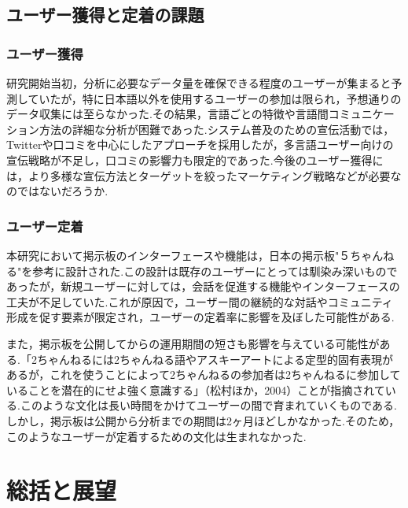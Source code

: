 \documentclass[b5paper,12pt,dvipdfmx]{jsreport}
\begin{document}
\subsection{ユーザー獲得と定着の課題}

\subsubsection{ユーザー獲得}
研究開始当初，分析に必要なデータ量を確保できる程度のユーザーが集まると予測していたが，特に日本語以外を使用するユーザーの参加は限られ，予想通りのデータ収集には至らなかった.その結果，言語ごとの特徴や言語間コミュニケーション方法の詳細な分析が困難であった.システム普及のための宣伝活動では，Twitterや口コミを中心にしたアプローチを採用したが，多言語ユーザー向けの宣伝戦略が不足し，口コミの影響力も限定的であった.今後のユーザー獲得には，より多様な宣伝方法とターゲットを絞ったマーケティング戦略などが必要なのではないだろうか.

\subsubsection{ユーザー定着}
本研究において掲示板のインターフェースや機能は，日本の掲示板"５ちゃんねる"を参考に設計された.この設計は既存のユーザーにとっては馴染み深いものであったが，新規ユーザーに対しては，会話を促進する機能やインターフェースの工夫が不足していた.これが原因で，ユーザー間の継続的な対話やコミュニティ形成を促す要素が限定され，ユーザーの定着率に影響を及ぼした可能性がある.

また，掲示板を公開してからの運用期間の短さも影響を与えている可能性がある.「2ちゃんねるには2ちゃんねる語やアスキーアートによる定型的固有表現があるが，これを使うことによって2ちゃんねるの参加者は2ちゃんねるに参加していることを潜在的にせよ強く意識する」（松村ほか，2004）ことが指摘されている.このような文化は長い時間をかけてユーザーの間で育まれていくものである.しかし，掲示板は公開から分析までの期間は2ヶ月ほどしかなかった.そのため，このようなユーザーが定着するための文化は生まれなかった.

\section{総括と展望}
\end{document}
